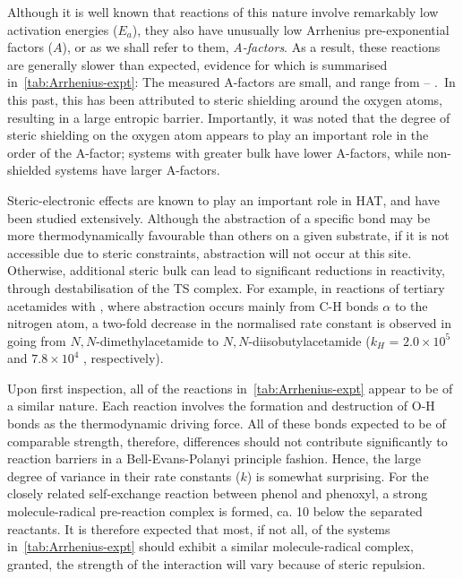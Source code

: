 Although it is well known that reactions of this nature involve remarkably low activation energies ($E_a$),\cite{Lucarini1996, Mahoney1970a, Mahoney1975, Korcek1972} they also have unusually low Arrhenius pre-exponential factors ($A$), or as we shall refer to them, \emph{A-factors}. As a result, these reactions are generally slower than expected, evidence for which is summarised in~\ref{tab:Arrhenius-expt}: The measured A-factors are small, and range from -- \Ms.\ In this past, this has been attributed to steric shielding around the oxygen atoms, resulting in a large entropic barrier.\cite{DiLabio2005} Importantly, it was noted that the degree of steric shielding on the oxygen atom appears to play an important role in the order of the A-factor; systems with greater bulk have lower A-factors, while non-shielded systems have larger A-factors.

Steric-electronic effects are known to play an important role in HAT, and have been studied extensively.\cite{Finn2004, Salamone2011, Pischel2001, Griller1981, Bietti2011, Salamone2012, Malatesta1982, Salamone2014} Although the abstraction of a specific bond may be more thermodynamically favourable than others on a given substrate, if it is not accessible due to steric constraints, abstraction will not occur at this site. Otherwise, additional steric bulk can lead to significant reductions in reactivity, through destabilisation of the TS complex. For example, in reactions of tertiary acetamides with \cumo,\cite{Salamone2014} where abstraction occurs mainly from C-H bonds $\alpha$ to the nitrogen atom, a two-fold decrease in the normalised rate constant is observed in going from $N,N$-dimethylacetamide to $N,N$-diisobutylacetamide ($k_H$ = $2.0 \times 10^5$ and $7.8 \times 10^4$ \Ms, respectively).

Upon first inspection, all of the reactions in~\ref{tab:Arrhenius-expt} appear to be of a similar nature. Each reaction involves the formation and destruction of O-H bonds as the thermodynamic driving force. All of these bonds expected to be of comparable strength, therefore, differences should not contribute significantly to reaction barriers in a Bell-Evans-Polanyi principle fashion. Hence, the large degree of variance in their rate constants ($k$) is somewhat surprising. For the closely related self-exchange reaction between phenol and phenoxyl,\cite{Mayer2002} a strong molecule-radical pre-reaction complex is formed, ca. 10 \kcalmol below the separated reactants. It is therefore expected that most, if not all, of the systems in~\ref{tab:Arrhenius-expt} should exhibit a similar molecule-radical complex, granted, the strength of the interaction will vary because of steric repulsion.

